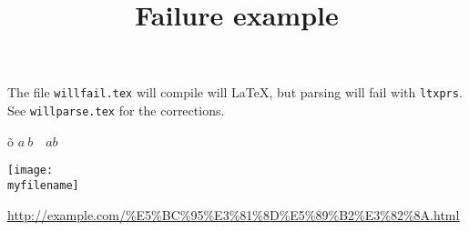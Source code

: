 \documentclass[french]{article}
\newcommand{\myfilename}{"$HOME/toto.png"}
\newcommand{\myurl}{\url{http://example.com/\%E5\%BC\%95\%E3\%81\%8D\%E5\%89\%B2\%E3\%82\%8A.html}}
\begin{document}
\title{Failure example}
The file \texttt{willfail.tex} will compile will \LaTeX, but parsing will fail with \texttt{ltxprs}.
See \texttt{willparse.tex} for the corrections. 



\~o $a\: b\quad ab$

\texttt{[image: \\myfilename]}

\myurl

\end{document}
